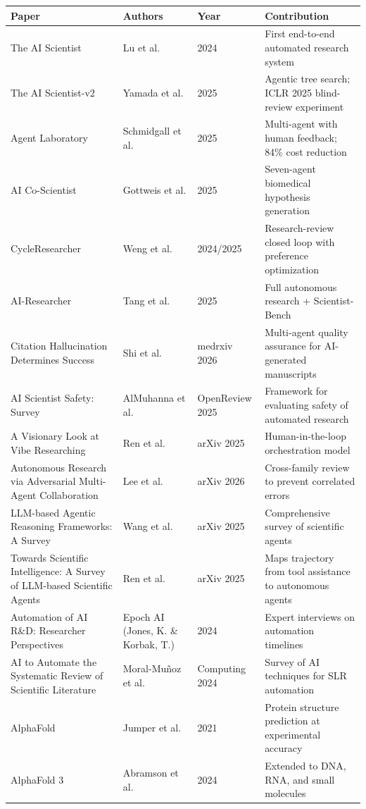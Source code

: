 \documentclass[11pt,a4paper]{article}
\begin{document}
\begin{longtable}{@{}p{4.2cm}p{3cm}p{1.2cm}p{5.5cm}@{}}
\toprule
\textbf{Paper} & \textbf{Authors} & \textbf{Year} & \textbf{Contribution} \\
\midrule
\endhead
The AI Scientist & Lu et al. & 2024 & First end-to-end automated research system \\
The AI Scientist-v2 & Yamada et al. & 2025 & Agentic tree search; ICLR 2025 blind-review experiment \\
Agent Laboratory & Schmidgall et al. & 2025 & Multi-agent with human feedback; 84\% cost reduction \\
AI Co-Scientist & Gottweis et al. & 2025 & Seven-agent biomedical hypothesis generation \\
CycleResearcher & Weng et al. & 2024/2025 & Research-review closed loop with preference optimization \\
AI-Researcher & Tang et al. & 2025 & Full autonomous research + Scientist-Bench \\
Citation Hallucination Determines Success & Shi et al. & medrxiv 2026 & Multi-agent quality assurance for AI-generated manuscripts \\
AI Scientist Safety: Survey & AlMuhanna et al. & OpenReview 2025 & Framework for evaluating safety of automated research \\
A Visionary Look at Vibe Researching & Ren et al. & arXiv 2025 & Human-in-the-loop orchestration model \\
Autonomous Research via Adversarial Multi-Agent Collaboration & Lee et al. & arXiv 2026 & Cross-family review to prevent correlated errors \\
LLM-based Agentic Reasoning Frameworks: A Survey & Wang et al. & arXiv 2025 & Comprehensive survey of scientific agents \\
Towards Scientific Intelligence: A Survey of LLM-based Scientific Agents & Ren et al. & arXiv 2025 & Maps trajectory from tool assistance to autonomous agents \\
Automation of AI R\&D: Researcher Perspectives & Epoch AI (Jones, K. \& Korbak, T.) & 2024 & Expert interviews on automation timelines \\
AI to Automate the Systematic Review of Scientific Literature & Moral-Mu\~{n}oz et al. & Computing 2024 & Survey of AI techniques for SLR automation \\
AlphaFold & Jumper et al. & 2021 & Protein structure prediction at experimental accuracy \\
AlphaFold 3 & Abramson et al. & 2024 & Extended to DNA, RNA, and small molecules \\

\end{longtable}
\end{document}
